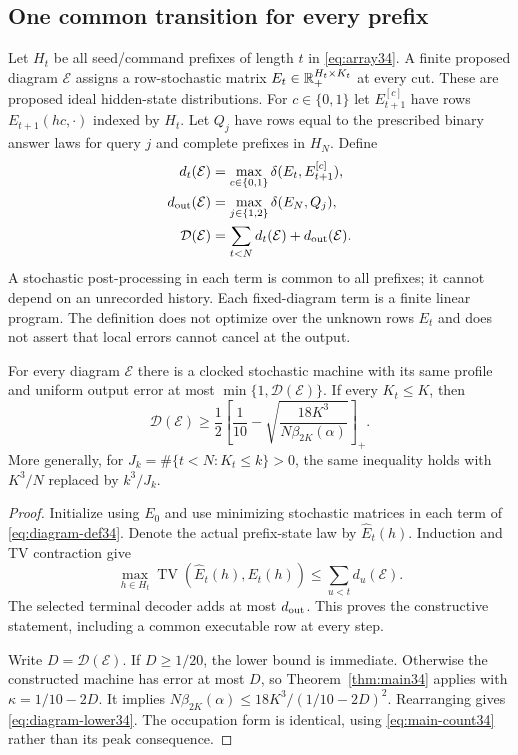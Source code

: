 \subsection{One common transition for every prefix}
Let $H_t$ be all seed/command prefixes of length $t$ in
\eqref{eq:array34}. A finite proposed diagram $\mathcal E$ assigns a
row-stochastic matrix $E_t\in\mathbb R_+^{H_t\times K_t}$ at every cut.
These are proposed ideal hidden-state distributions. For $c\in\{0,1\}$
let $E_{t+1}^{[c]}$ have rows $E_{t+1}(h c,\cdot)$ indexed by $H_t$.
Let $Q_j$ have rows equal to the prescribed binary answer laws for query
$j$ and complete prefixes in $H_N$. Define
\begin{equation}\label{eq:diagram-def34}
 \begin{split}
 d_t(\mathcal E)&=\max_{c\in\{0,1\}}\delta(E_t,E_{t+1}^{[c]}),\\
 d_{\rm out}(\mathcal E)&=\max_{j\in\{1,2\}}\delta(E_N,Q_j),\\
 \mathcal D(\mathcal E)&=\sum_{t<N}d_t(\mathcal E)+d_{\rm out}(\mathcal E).
 \end{split}
\end{equation}
A stochastic post-processing in each term is common to all prefixes; it
cannot depend on an unrecorded history. Each fixed-diagram term is a finite
linear program. The definition does not optimize over the unknown rows
$E_t$ and does not assert that local errors cannot cancel at the output.

\begin{theorem}
\label{thm:diagram34}
For every diagram $\mathcal E$ there is a clocked stochastic machine with
its same profile and uniform output error at most
$\min\{1,\mathcal D(\mathcal E)\}$. If every $K_t\le K$, then
\begin{equation}\label{eq:diagram-lower34}
 \mathcal D(\mathcal E)\ge\frac12
 \left[\frac1{10}-\sqrt{\frac{18K^3}{N\beta_{2K}(\alpha)}}\right]_+.
\end{equation}
More generally, for $J_k=\#\{t<N:K_t\le k\}>0$, the same inequality
holds with $K^3/N$ replaced by $k^3/J_k$.
\end{theorem}
\begin{proof}
Initialize using $E_0$ and use minimizing stochastic matrices in each
term of \eqref{eq:diagram-def34}. Denote the actual prefix-state law by
$\widehat E_t(h)$. Induction and TV contraction give
\[
 \max_{h\in H_t}\operatorname{TV}(\widehat E_t(h),E_t(h))
                                      \le\sum_{u<t}d_u(\mathcal E).
\]
The selected terminal decoder adds at most $d_{\rm out}$. This proves the
constructive statement, including a common executable row at every step.

Write $D=\mathcal D(\mathcal E)$. If $D\ge1/20$, the lower bound is
immediate. Otherwise the constructed machine has error at most $D$, so
Theorem~\ref{thm:main34} applies with $\kappa=1/10-2D$. It implies
$N\beta_{2K}(\alpha)\le18K^3/(1/10-2D)^2$. Rearranging gives
\eqref{eq:diagram-lower34}. The occupation form is identical, using
\eqref{eq:main-count34} rather than its peak consequence.
\end{proof}

